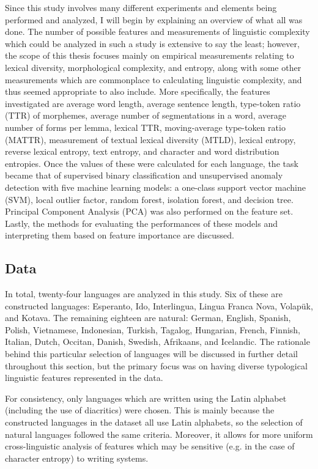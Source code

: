 \documentclass[12pt,a4paper]{article}
\numberwithin{figure}{section}
\numberwithin{table}{section}
\numberwithin{definition}{section}
\begin{document}
Since this study involves many different experiments and elements being performed and analyzed, I will begin by explaining an overview of what all was done. The number of possible features and measurements of linguistic complexity which could be analyzed in such a study is extensive to say the least; however, the scope of this thesis focuses mainly on empirical measurements relating to lexical diversity, morphological complexity, and entropy, along with some other measurements which are commonplace to calculating linguistic complexity, and thus seemed appropriate to also include. More specifically, the features investigated are average word length, average sentence length, type-token ratio (TTR) of morphemes, average number of segmentations in a word, average number of forms per lemma, lexical TTR, moving-average type-token ratio (MATTR), measurement of textual lexical diversity (MTLD), lexical entropy, reverse lexical entropy, text entropy, and character and word distribution entropies. Once the values of these were calculated for each language, the task became that of supervised binary classification and unsupervised anomaly detection with five machine learning models: a one-class support vector machine (SVM), local outlier factor, random forest, isolation forest, and decision tree. Principal Component Analysis (PCA) was also performed on the feature set. Lastly, the methods for evaluating the performances of these models and interpreting them based on feature importance are discussed.

\subsection{Data}
\label{ssec:data}


In total, twenty-four languages are analyzed in this study. Six of these are constructed languages: Esperanto, Ido, Interlingua, Lingua Franca Nova, Volapük, and Kotava. The remaining eighteen are natural: German, English, Spanish, Polish, Vietnamese, Indonesian, Turkish, Tagalog, Hungarian, French, Finnish, Italian, Dutch, Occitan, Danish, Swedish, Afrikaans, and Icelandic. The rationale behind this particular selection of languages will be discussed in further detail throughout this section, but the primary focus was on having diverse typological linguistic features represented in the data.

For consistency, only languages which are written using the Latin alphabet (including the use of diacritics) were chosen. This is mainly because the constructed languages in the dataset all use Latin alphabets, so the selection of natural languages followed the same criteria. Moreover, it allows for more uniform cross-linguistic analysis of features which may be sensitive (e.g. in the case of character entropy) to writing systems.
\end{document}
